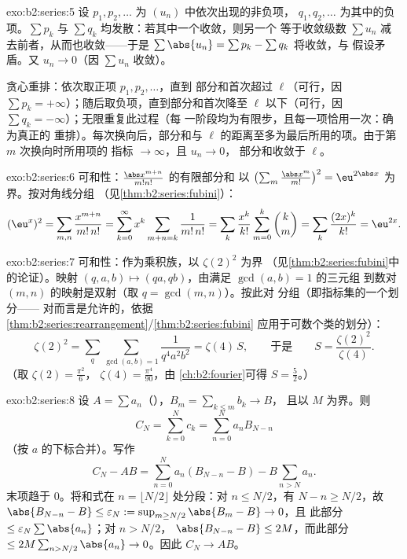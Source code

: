 \begin{solution}{exo:b2:series:5}
设 $p_1, p_2, \dots$ 为 $(u_n)$ 中依次出现的非负项，
$q_1, q_2, \dots$ 为其中的负项。$\sum p_k$ 与 $\sum
q_k$ 均发散：若其中一个收敛，则另一个
等于收敛级数 $\sum u_n$ 减去前者，从而也收敛——于是
$\sum \abs{u_n} = \sum p_k - \sum q_k$ 将收敛，与
假设矛盾。又 $u_n \to 0$（因 $\sum u_n$ 收敛）。

贪心重排：依次取正项 $p_1, p_2, \dots$，直到
部分和首次超过 $\ell$（可行，因 $\sum p_k =
+\infty$）；随后取负项，直到部分和首次降至
$\ell$ 以下（可行，因 $\sum q_k = -\infty$）；无限重复此过程（每
一阶段均为有限步，且每一项恰用一次：确为真正的
重排）。每次换向后，部分和与
$\ell$ 的距离至多为最后所用的项。由于第 $m$ 次换向时所用项的
指标 $\to \infty$，且 $u_n \to 0$，
部分和收敛于 $\ell$。
\end{solution}

\begin{solution}{exo:b2:series:6}
可和性：$\frac{\abs x^{m+n}}{m!n!}$ 的有限部分和
以 $\bigl(\sum_m
\frac{\abs x^m}{m!}\bigr)^2 = \eu^{2\abs x}$ 为界。按对角线分组
（见\cref{thm:b2:series:fubini}）：
\[
(\eu^{x})^2 = \sum_{m,n} \frac{x^{m+n}}{m!\,n!}
= \sum_{k=0}^{\infty} x^k \sum_{m+n=k} \frac{1}{m!\,n!}
= \sum_k \frac{x^k}{k!}\sum_{m=0}^{k}\binom km
= \sum_k \frac{(2x)^k}{k!} = \eu^{2x} .
\]
\end{solution}

\begin{solution}{exo:b2:series:7}
可和性：作为乘积族，以 $\zeta(2)^2$ 为界
（见\cref{thm:b2:series:fubini}中的论证）。映射
$(q, a, b) \mapsto (qa, qb)$，由满足 $\gcd(a, b) = 1$ 的三元组
到数对 $(m, n)$ 的映射是双射（取 $q = \gcd(m,n)$）。按此对
分组（即指标集的一个划分——
对而言是允许的，依据
\cref{thm:b2:series:rearrangement}/\cref{thm:b2:series:fubini}
应用于可数个类的划分）：
\[
\zeta(2)^2 = \sum_{q} \sum_{\gcd(a,b)=1} \frac{1}{q^4 a^2 b^2}
= \zeta(4)\, S,
\qquad\text{于是}\qquad
S = \frac{\zeta(2)^2}{\zeta(4)} .
\]
（取 $\zeta(2) = \frac{\pi^2}{6}$，
$\zeta(4) = \frac{\pi^4}{90}$，由
\cref{ch:b2:fourier}可得 $S = \frac{5}{2}$。）
\end{solution}

\begin{solution}{exo:b2:series:8}
设 $A = \sum a_n$（），$B_m = \sum_{k\leq m} b_k \to B$，
且以 $M$ 为界。则
\[
C_N = \sum_{k=0}^{N} c_k = \sum_{n=0}^{N} a_n B_{N-n}
\]
（按 $a$ 的下标合并）。写作
\[
C_N - AB = \sum_{n=0}^{N} a_n (B_{N-n} - B) - B\sum_{n > N} a_n .
\]
末项趋于 $0$。将和式在 $n = \lfloor N/2
\rfloor$ 处分段：对 $n \leq N/2$，有 $N - n \geq N/2$，故 $\abs{B_{N-n} - B}
\leq \varepsilon_N := \sup_{m \geq N/2}\abs{B_m - B} \to 0$，且
此部分 $\leq \varepsilon_N \sum\abs{a_n}$；对 $n > N/2$，
$\abs{B_{N-n} - B} \leq 2M$，而此部分 $\leq 2M \sum_{n >
N/2} \abs{a_n} \to 0$。因此 $C_N \to AB$。
\end{solution}

